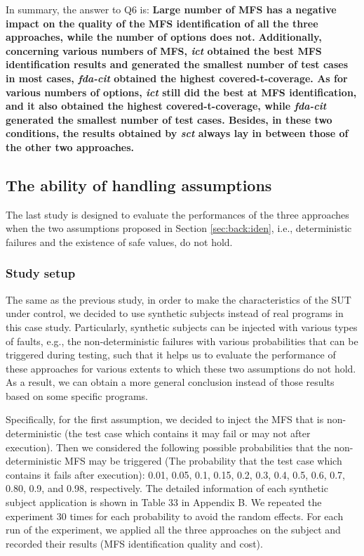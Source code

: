 \documentclass[journal,12pt,onecolumn,draftclsnofoot,]{IEEEtran}
\begin{document}
In summary, the answer to Q6 is:
\textbf{Large number of MFS has a negative impact on the quality of the MFS identification of all the three approaches, while the number of options does not.} {\color{red}\textbf{Additionally, concerning various numbers of MFS, \emph{ict} obtained the best MFS identification results and generated the smallest number of test cases in most cases, \emph{fda-cit} obtained the highest covered-t-coverage. As for various numbers of options, \emph{ict} still did the best at MFS identification, and it also obtained the highest covered-t-coverage, while \emph{fda-cit} generated the smallest number of test cases. Besides, in these two conditions, the results obtained by \emph{sct} always lay in between those of the other two approaches.}}

\subsection{The ability of handling assumptions}\label{sec:emprical:Assumption}
The last study is designed to evaluate the performances of the three approaches when the two assumptions proposed in Section \ref{sec:back:iden}, i.e., deterministic failures and the existence of safe values,  do not hold.

\subsubsection{Study setup}
The same as the previous study, in order to make the characteristics of the SUT under control, we decided to use synthetic subjects instead of real programs in this case study. Particularly, synthetic subjects can be injected with various types of faults, e.g., the non-deterministic failures with various probabilities that can be triggered during testing, such that it helps us to evaluate the performance of these approaches for various extents to which these two assumptions do not hold. As a result, we can obtain a more general conclusion instead of those results based on some specific programs.

Specifically, for the first assumption, we decided to inject the MFS that is non-deterministic (the test case which contains it may fail or may not after execution). Then we considered the following possible probabilities that the non-deterministic MFS may be triggered (The probability that the test case which contains it fails after execution): 0.01, 0.05, 0.1, 0.15, 0.2, 0.3, 0.4, 0.5, 0.6, 0.7, 0.80, 0.9, and 0.98, respectively. {\color{red}The detailed information of each synthetic subject application is shown in Table 33 in Appendix B.} We repeated the experiment 30 times for each probability to avoid the random effects. For each run of the experiment, we applied all the three approaches on the subject and recorded their results (MFS identification quality and cost).
\end{document}

